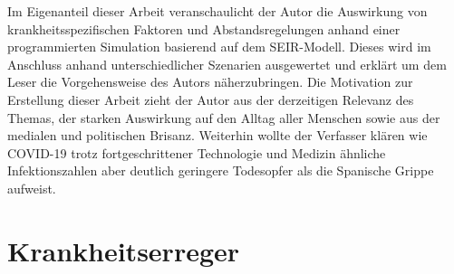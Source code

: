 \documentclass[12pt]{article}
\begin{document}
Im Eigenanteil dieser Arbeit veranschaulicht der Autor die Auswirkung von krankheitsspezifischen Faktoren und Abstandsregelungen anhand einer programmierten Simulation basierend auf dem SEIR-Modell. Dieses wird im Anschluss anhand unterschiedlicher Szenarien ausgewertet und erklärt um dem Leser die Vorgehensweise des Autors näherzubringen. Die Motivation zur Erstellung dieser Arbeit zieht der Autor aus der derzeitigen Relevanz des Themas, der starken Auswirkung auf den Alltag aller Menschen sowie aus der medialen und politischen Brisanz. Weiterhin wollte der Verfasser klären wie COVID-19 trotz fortgeschrittener Technologie und Medizin ähnliche Infektionszahlen aber deutlich geringere Todesopfer als die Spanische Grippe aufweist.

\newpage
\section{Krankheitserreger}\label{sec:Krankheitserreger}
\end{document}
